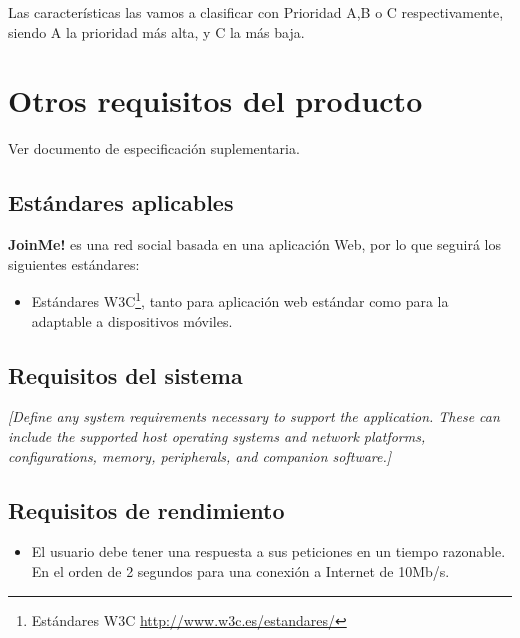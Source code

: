 \documentclass[12pt, a4paper, titlepage]{article}
\begin{document}
Las características las vamos a clasificar con Prioridad A,B o C respectivamente, siendo A la prioridad más alta, y C la más baja.


\section{Otros requisitos del producto}

Ver documento de especificación suplementaria.

\subsection{Estándares aplicables}

\textbf{JoinMe!} es una red social basada en una aplicación Web, por lo que seguirá los siguientes estándares:
\begin{itemize}
\item Estándares W3C\footnote{Estándares W3C \url{http://www.w3c.es/estandares/}}, tanto para aplicación web estándar como para la adaptable a dispositivos móviles.
\end{itemize}

\subsection{Requisitos del sistema}

\textit{{\color{blue}[Define any system requirements necessary to support the application. These can include the supported host operating systems and network platforms, configurations, memory, peripherals, and companion software.]}}

\subsection{Requisitos de rendimiento}


\begin{itemize}
\item El usuario debe tener una respuesta a sus peticiones en un tiempo razonable. En el orden de 2 segundos para una conexión a Internet de 10Mb/s.

\end{itemize}
\end{document}
